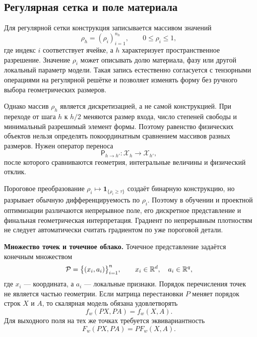 \subsection{Регулярная сетка и поле материала}
Для регулярной сетки конструкция записывается массивом значений
\begin{equation}
 \rho_h=(\rho_i)_{i=1}^{n_h},
 \qquad
 0\leq\rho_i\leq1,
\end{equation}
где индекс $i$ соответствует ячейке, а $h$ характеризует пространственное разрешение. Значение $\rho_i$ может описывать долю материала, фазу или другой локальный параметр модели. Такая запись естественно согласуется с тензорными операциями на регулярной решётке и позволяет изменять форму без ручного выбора геометрических размеров.

Однако массив $\rho_h$ является дискретизацией, а не самой конструкцией. При переходе от шага $h$ к $h/2$ меняются размер входа, число степеней свободы и минимальный разрешимый элемент формы. Поэтому равенство физических объектов нельзя определять покоординатным сравнением массивов разных размеров. Нужен оператор переноса
\begin{equation}
 \mathsf P_{h\to h'}:
 \mathcal X_h\to\mathcal X_{h'},
\end{equation}
после которого сравниваются геометрия, интегральные величины и физический отклик.

Пороговое преобразование $\rho_i\mapsto\mathbf 1_{\{\rho_i\geq\tau\}}$ создаёт бинарную конструкцию, но разрывает обычную дифференцируемость по $\rho_i$. Поэтому в обучении и проектной оптимизации различаются непрерывное поле, его дискретное представление и финальная геометрическая интерпретация. Градиент по непрерывным плотностям не следует автоматически считать градиентом по уже пороговой детали.

\medskip
\noindent\textbf{Множество точек и точечное облако.}
Точечное представление задаётся конечным множеством
\begin{equation}
 \mathcal P
 =
 \bigl\{(x_i,a_i)\bigr\}_{i=1}^{n},
 \qquad
 x_i\in\mathbb{R}^d,
 \quad
 a_i\in\mathbb{R}^q,
\end{equation}
где $x_i$ --- координата, а $a_i$ --- локальные признаки. Порядок перечисления точек не является частью геометрии. Если матрица перестановки $P$ меняет порядок строк $X$ и $A$, то скалярная модель обязана удовлетворять
\begin{equation}
 f_w(PX,PA)=f_w(X,A).
\end{equation}
Для выходного поля на тех же точках требуется эквивариантность
\begin{equation}
 F_w(PX,PA)=P F_w(X,A).
\end{equation}

